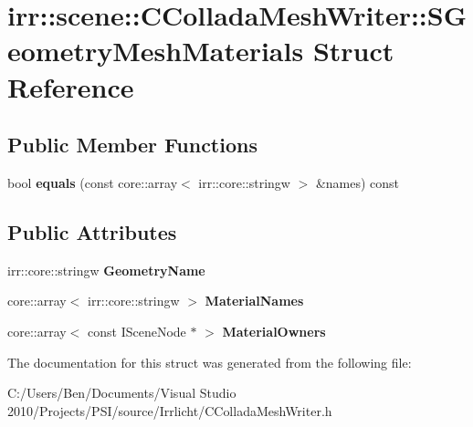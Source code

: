 \hypertarget{structirr_1_1scene_1_1_c_collada_mesh_writer_1_1_s_geometry_mesh_materials}{\section{irr\-:\-:scene\-:\-:C\-Collada\-Mesh\-Writer\-:\-:S\-Geometry\-Mesh\-Materials Struct Reference}
\label{structirr_1_1scene_1_1_c_collada_mesh_writer_1_1_s_geometry_mesh_materials}
}
\subsection*{Public Member Functions}
\begin{DoxyCompactItemize}
\item 
\hypertarget{structirr_1_1scene_1_1_c_collada_mesh_writer_1_1_s_geometry_mesh_materials_ac15e4f74769651fb667b85124d2fb7d0}{bool {\bfseries equals} (const core\-::array$<$ irr\-::core\-::stringw $>$ \&names) const }\label{structirr_1_1scene_1_1_c_collada_mesh_writer_1_1_s_geometry_mesh_materials_ac15e4f74769651fb667b85124d2fb7d0}

\end{DoxyCompactItemize}
\subsection*{Public Attributes}
\begin{DoxyCompactItemize}
\item 
\hypertarget{structirr_1_1scene_1_1_c_collada_mesh_writer_1_1_s_geometry_mesh_materials_a40ec65fbf193846bab25ef3f0690bb73}{irr\-::core\-::stringw {\bfseries Geometry\-Name}}\label{structirr_1_1scene_1_1_c_collada_mesh_writer_1_1_s_geometry_mesh_materials_a40ec65fbf193846bab25ef3f0690bb73}

\item 
\hypertarget{structirr_1_1scene_1_1_c_collada_mesh_writer_1_1_s_geometry_mesh_materials_ab61d48a95706fbce124af888f57bf94c}{core\-::array$<$ irr\-::core\-::stringw $>$ {\bfseries Material\-Names}}\label{structirr_1_1scene_1_1_c_collada_mesh_writer_1_1_s_geometry_mesh_materials_ab61d48a95706fbce124af888f57bf94c}

\item 
\hypertarget{structirr_1_1scene_1_1_c_collada_mesh_writer_1_1_s_geometry_mesh_materials_a74463d2d2734741c1c3e44a2531634c6}{core\-::array$<$ const I\-Scene\-Node $\ast$ $>$ {\bfseries Material\-Owners}}\label{structirr_1_1scene_1_1_c_collada_mesh_writer_1_1_s_geometry_mesh_materials_a74463d2d2734741c1c3e44a2531634c6}

\end{DoxyCompactItemize}


The documentation for this struct was generated from the following file\-:\begin{DoxyCompactItemize}
\item 
C\-:/\-Users/\-Ben/\-Documents/\-Visual Studio 2010/\-Projects/\-P\-S\-I/source/\-Irrlicht/C\-Collada\-Mesh\-Writer.\-h\end{DoxyCompactItemize}
